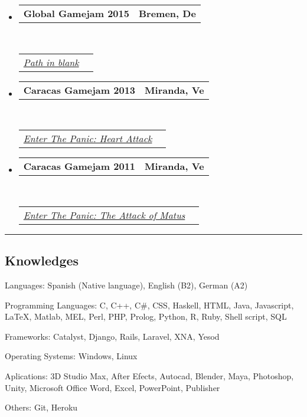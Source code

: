 \documentclass[10pt,letterpaper]{article}
\makeatletter
\newenvironment{indentsection}[1]%
{\begin{list}{}%
	{\setlength{\leftmargin}{#1}}%
	\item[]%
}
{\end{list}}
\newcommand{\headerrow}[2]
{\begin{tabular*}{\linewidth}{l@{\extracolsep{\fill}}r}
	#1 &
	#2 \\
\end{tabular*}}
\makeatother
\begin{document}
\begin{itemize}
	\parskip=0.1em
\item 
   \headerrow
   {\textbf{Global Gamejam 2015}}
   {\textbf{Bremen, De}}
  \\
  \headerrow
   {\emph{\href{http://globalgamejam.org/2015/games/path-blank}{Path in blank}}}{}
\item 
   \headerrow
   {\textbf{Caracas Gamejam 2013}}
   {\textbf{Miranda, Ve}}
	\\
	\headerrow
   {\emph{\href{http://globalgamejam.org/2013/enter-panic-heart-attack}{Enter The Panic: Heart Attack}}}{}
\item 
   \headerrow
   {\textbf{Caracas Gamejam 2011}}
   {\textbf{Miranda, Ve}}
	\\
	\headerrow
   {\emph{\href{http://archive.globalgamejam.org/2011/enter-panic-attack-matus}{Enter The Panic: The Attack of Matus}}}{}
\end{itemize}


\hrule
\vspace{-0.4em}
\subsection*{Knowledges}

\begin{indentsection}{\parindent}
\begin{description*}
	
\item[Languages:]
  Spanish (Native language), English (B2), German (A2)
\item[Programming Languages:]
  C, C++, C\#, CSS, Haskell, HTML, Java, Javascript, \LaTeX, Matlab, MEL, Perl, PHP, Prolog, Python, R, Ruby, Shell script, SQL
\item[Frameworks:]
  Catalyst, Django, Rails, Laravel, XNA, Yesod
\item[Operating Systems:]
  Windows, Linux
\item[Aplications:]
  3D Studio Max, After Efects, Autocad, Blender, Maya, Photoshop, Unity, Microsoft Office Word, Excel, PowerPoint, Publisher
\item[Others:]
  Git, Heroku
  
\end{description*}
\end{indentsection}
\end{document}
